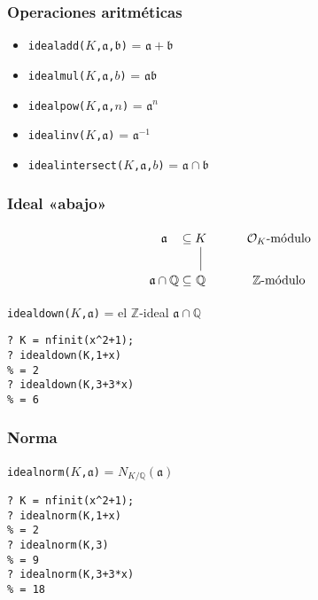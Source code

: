 \documentclass{beamer}
\newcommand{\ZZ}{\mathbb{Z}}
\newcommand{\QQ}{\mathbb{Q}}
\renewcommand{\O}{\mathcal{O}}
\begin{document}

\begin{frame}[fragile]
  \frametitle{Operaciones aritméticas}

  \begin{itemize}
  \item \texttt{idealadd($K$,$\mathfrak{a}$,$\mathfrak{b}$)} = $\mathfrak{a}+\mathfrak{b}$
  \item \texttt{idealmul($K$,$\mathfrak{a}$,$b$)} = $\mathfrak{a}\mathfrak{b}$
  \item \texttt{idealpow($K$,$\mathfrak{a}$,$n$)} = $\mathfrak{a}^n$
  \item \texttt{idealinv($K$,$\mathfrak{a}$)} = $\mathfrak{a}^{-1}$
  \item \texttt{idealintersect($K$,$\mathfrak{a}$,$b$)} = $\mathfrak{a} \cap \mathfrak{b}$
  \end{itemize}
\end{frame}


\begin{frame}[fragile]
  \frametitle{Ideal «abajo»}

  \[ \begin{tikzcd}
    \mathfrak{a} &[-3em] \subseteq &[-3em] K\ar[-]{d} & \O_K\text{-módulo} \\
    \mathfrak{a}\cap \QQ & \subseteq & \QQ & \ZZ\text{-módulo}
    \end{tikzcd} \]

  \begin{center}
    \texttt{idealdown($K$,$\mathfrak{a}$)} = el $\ZZ$-ideal $\mathfrak{a} \cap \QQ$
  \end{center}

  \begin{shaded}
\begin{verbatim}
? K = nfinit(x^2+1);
? idealdown(K,1+x)
% = 2
? idealdown(K,3+3*x)
% = 6
\end{verbatim}
  \end{shaded}
\end{frame}


\begin{frame}[fragile]
  \frametitle{Norma}

  \begin{center}
    \texttt{idealnorm($K$,$\mathfrak{a}$)} = $N_{K/\QQ} (\mathfrak{a})$
  \end{center}

  \begin{shaded}
\begin{verbatim}
? K = nfinit(x^2+1);
? idealnorm(K,1+x)
% = 2
? idealnorm(K,3)
% = 9
? idealnorm(K,3+3*x)
% = 18
\end{verbatim}
  \end{shaded}
\end{frame}
\end{document}
